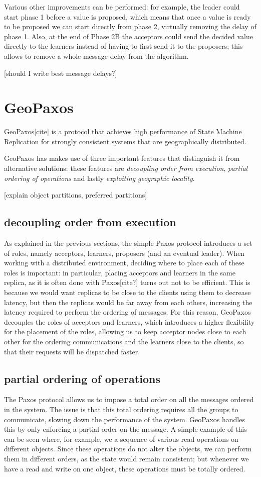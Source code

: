 Various other improvements can be performed: for example, the leader could start phase 1 before a value is proposed, which means that once a value is ready to be proposed we can start directly from phase 2, virtually removing the delay of phase 1.
Also, at the end of Phase 2B the acceptors could send the decided value directly to the learners instead of having to first send it to the proposers; this allows to remove a whole message delay from the algorithm.

[should I write best message delays?]

\section{GeoPaxos}\label{sec:GeoPaxos}
GeoPaxos[cite] is a protocol that achieves high performance of State Machine Replication for strongly consistent systems that are geographically distributed. 

GeoPaxos has makes use of three important features that distinguish it from alternative solutions: these features are \emph{decoupling order from execution}, \emph{partial ordering of operations} and lastly \emph{exploiting geographic locality}.

[explain object partitions, preferred partitions]

\subsection{decoupling order from execution}
As explained in the previous sections, the simple Paxos protocol introduces a set of roles, namely acceptors, learners, proposers (and an eventual leader). When working with a distributed environment, deciding where to place each of these roles is important: in particular, placing acceptors and learners in the same replica, as it is often done with Paxos[cite?] turns out not to be efficient. This is because we would want replicas to be close to the clients using them to decrease latency, but then the replicas would be far away from each others, increasing the latency required to perform the ordering of messages. For this reason, GeoPaxos decouples the roles of acceptors and learners, which introduces a higher flexibility for the placement of the roles, allowing us to keep acceptor nodes close to each other for the ordering communications and the learners close to the clients, so that their requests will be dispatched faster.
\subsection{partial ordering of operations}
The Paxos protocol allows us to impose a total order on all the messages ordered in the system. The issue is that this total ordering requires all the groups to communicate, slowing down the performance of the system. GeoPaxos handles this by only enforcing a partial order on the message.
A simple example of this can be seen where, for example, we a sequence of various read operations on different objects. Since these operations do not alter the objects, we can perform them in different orders, as the state would remain consistent; but whenever we have a read and write on one object, these operations must be totally ordered.
